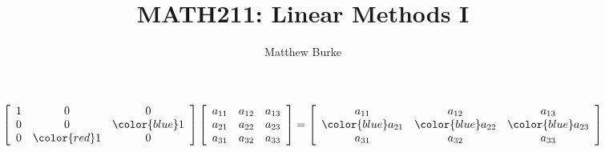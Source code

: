 \message{ !name(2018-09-20slides.tex)}\documentclass{beamer}
\title{MATH211: Linear Methods I}
\author{Matthew Burke}
\date{\lectureDate}
\begin{document}
\begin{equation*}
    \left[
      \begin{array}{ccc}
        1&0&0\\
        0&0&{\color{blue}1}\\
        0&{\color{red}1}&0\\
      \end{array}
    \right]
    \left[
      \begin{array}{ccc}
        a_{11}&a_{12}&a_{13}\\
        a_{21}&a_{22}&a_{23}\\
        a_{31}&a_{32}&a_{33}
      \end{array}
    \right]=
    \left[
      \begin{array}{ccc}
        a_{11}&a_{12}&a_{13}\\
        {\color{blue}a_{21}}&{\color{blue}a_{22}}&{\color{blue}a_{23}}\\
        a_{31}&a_{32}&a_{33}
      \end{array}
    \right]
  \end{equation*}
\end{document}
